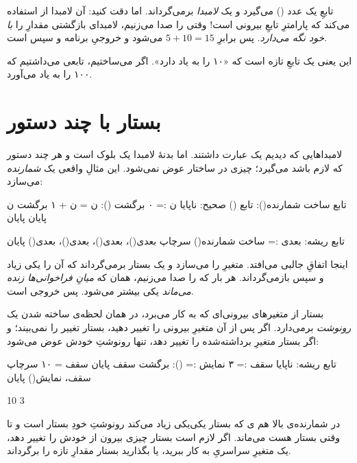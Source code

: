 تابعِ  یک عدد () می‌گیرد و یک \emph{لامبدا}
برمی‌گرداند. اما دقت کنید: آن لامبدا  از
 استفاده می‌کند که پارامترِ تابعِ بیرونی است! وقتی
 را صدا می‌زنیم، لامبدای بازگشتی مقدارِ  را
\emph{با خود نگه می‌دارد}. پس  برابرِ $5 + 10 = 15$ می‌شود و
خروجیِ برنامه  و سپس  است.

این یعنی  یک تابعِ تازه است که «۱۰ را به یاد دارد». اگر
 می‌ساختیم، تابعی می‌داشتیم که ۱۰۰ را به یاد می‌آورد.

\section{بستار با چند دستور}

لامبداهایی که دیدیم یک عبارت داشتند. اما بدنهٔ لامبدا یک بلوک است و هر چند
دستور که لازم باشد می‌گیرد؛ چیزی در ساختار عوض نمی‌شود. این مثالِ واقعی یک
\emph{شمارنده} می‌سازد:

\begin{salamfa}
تابع ساخت شمارنده(): تابع () صحیح:
    ناپایا ن := ۰
    برگشت ():
        ن = ن + ۱
        برگشت ن
    پایان
پایان

تابع ریشه:
    بعدی := ساخت شمارنده()
    سرچاپ بعدی()، بعدی()، بعدی()، بعدی()
پایان
\end{salamfa}

اینجا اتفاقِ جالبی می‌افتد.  متغیرِ  را می‌سازد و
یک بستار برمی‌گرداند که آن را یکی زیاد و سپس بازمی‌گرداند. هر بار که
 را صدا می‌زنیم، همان  که \emph{میانِ فراخوانی‌ها زنده
می‌ماند} یکی بیشتر می‌شود. پس خروجی  است.

\begin{warn}
بستار از متغیرهای بیرونی‌ای که به کار می‌برد، در همان لحظه‌ی ساخته شدن یک
\emph{رونوشت} برمی‌دارد. اگر پس از آن متغیرِ بیرونی را تغییر دهید، بستار تغییر
را نمی‌بیند؛ و اگر بستار متغیرِ برداشته‌شده را تغییر دهد، تنها رونوشتِ خودش
عوض می‌شود:

\begin{salamfa}
تابع ریشه:
    ناپایا سقف := ۳
    نمایش := (): برگشت سقف پایان
    سقف = ۱۰
    سرچاپ سقف، نمایش()
پایان
\end{salamfa}

\begin{progoutfa}
10 3
\end{progoutfa}

در شمارنده‌ی بالا هم ی که بستار یکی‌یکی زیاد می‌کند رونوشتِ خودِ
بستار است و تا وقتی بستار هست می‌ماند. اگر لازم است بستار چیزی بیرون از خودش را
تغییر دهد، یک متغیرِ سراسریِ  به کار ببرید، یا بگذارید بستار مقدارِ
تازه را برگرداند.
\end{warn}

